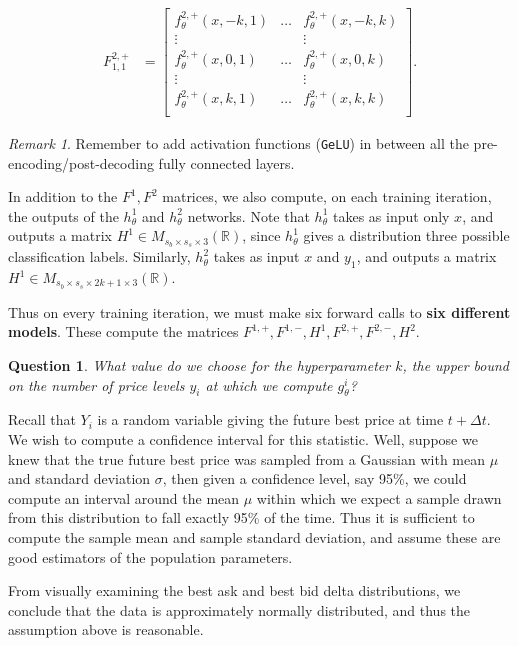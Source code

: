 \documentclass[12pt, reqno]{amsart}
\theoremstyle{definition}
\theoremstyle{definition}
\theoremstyle{plain}
\newtheorem{Ques}[theorem]{Question}
\theoremstyle{definition}
\theoremstyle{remark}
\newtheorem{rem}[theorem]{Remark}
\newcommand{\R}{\mathbb{R}}				%
\newcommand{\bee}{\begin{equation}\begin{aligned}}
\newcommand{\eee}{\end{aligned}\end{equation}}
\renewcommand{\'}{\hspace{0.5mm}'}			%
\begin{document}
\bee
	F_{1,1}^{2,+}
	&=
		\begin{bmatrix}
			f_\theta^{2,+}(x,-k,1) 
			& \hdots
			& f_\theta^{2,+}(x,-k,k) \\
			\vdots &  & \vdots \\
			f_\theta^{2,+}(x,0,1) 
			& \hdots
			& f_\theta^{2,+}(x,0,k) \\
			\vdots &  & \vdots \\
			f_\theta^{2,+}(x,k,1) 
			& \hdots
			& f_\theta^{2,+}(x,k,k) \\
		\end{bmatrix}. 
\eee

\begin{rem}
	Remember to add activation functions (\texttt{GeLU}) in between all the pre-encoding/post-decoding fully connected layers. 
\end{rem}

In addition to the $F^1, F^2$ matrices, we also compute, on each training iteration, the outputs of the $h_\theta^{1}$ and $h_\theta^2$ networks. Note that $h_\theta^1$ takes as input only $x$, and outputs a matrix $H^1 \in M_{s_b \times s_s \times 3}(\R)$, since $h_\theta^1$ gives a distribution three possible classification labels. Similarly, $h_\theta^2$ takes as input $x$ and $y_1$, and outputs a matrix $H^1 \in M_{s_b \times s_s \times 2k + 1 \times 3}(\R)$. 

Thus on every training iteration, we must make six forward calls to \textbf{six different models}. These compute the matrices $F^{1,+}, F^{1,-}, H^1, F^{2,+}, F^{2,-}, H^2$. 

\begin{Ques}
	What value do we choose for the hyperparameter $k$, the upper bound on the number of price levels $y_i$ at which we compute $g_\theta^i$?
\end{Ques}

Recall that $Y_i$ is a random variable giving the future best price at time $t + \Delta t$. We wish to compute a confidence interval for this statistic. Well, suppose we knew that the true future best price was sampled from a Gaussian with mean $\mu$ and standard deviation $\sigma$, then given a confidence level, say 95\%, we could compute an interval around the mean $\mu$ within which we expect a sample drawn from this distribution to fall exactly 95\% of the time. Thus it is sufficient to compute the sample mean and sample standard deviation, and assume these are good estimators of the population parameters. 

From visually examining the best ask and best bid delta distributions, we conclude that the data is approximately normally distributed, and thus the assumption above is reasonable. 
\end{document}
